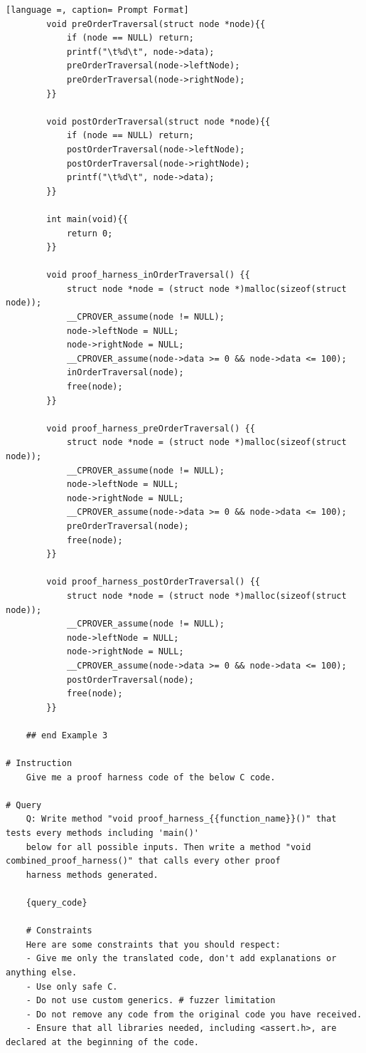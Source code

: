 \documentclass[onecolumn]{NobArticle}
\begin{document}
\begin{lstlisting}[language =, caption= Prompt Format]
		void preOrderTraversal(struct node *node){{
		    if (node == NULL) return;
		    printf("\t%d\t", node->data);
		    preOrderTraversal(node->leftNode);
		    preOrderTraversal(node->rightNode);
		}}
		
		void postOrderTraversal(struct node *node){{
		    if (node == NULL) return;
		    postOrderTraversal(node->leftNode);
		    postOrderTraversal(node->rightNode);
		    printf("\t%d\t", node->data);
		}}
		
		int main(void){{
		    return 0;
		}}
		
		void proof_harness_inOrderTraversal() {{
		    struct node *node = (struct node *)malloc(sizeof(struct node));
		    __CPROVER_assume(node != NULL);
		    node->leftNode = NULL;
		    node->rightNode = NULL;
		    __CPROVER_assume(node->data >= 0 && node->data <= 100);
		    inOrderTraversal(node);
		    free(node);
		}}
		
		void proof_harness_preOrderTraversal() {{
		    struct node *node = (struct node *)malloc(sizeof(struct node));
		    __CPROVER_assume(node != NULL);
		    node->leftNode = NULL;
		    node->rightNode = NULL;
		    __CPROVER_assume(node->data >= 0 && node->data <= 100);
		    preOrderTraversal(node);
		    free(node);
		}}
		
		void proof_harness_postOrderTraversal() {{
		    struct node *node = (struct node *)malloc(sizeof(struct node));
		    __CPROVER_assume(node != NULL);
		    node->leftNode = NULL;
		    node->rightNode = NULL;
		    __CPROVER_assume(node->data >= 0 && node->data <= 100);
		    postOrderTraversal(node);
		    free(node);
		}}
		
	## end Example 3
				
# Instruction
    Give me a proof harness code of the below C code.

# Query
    Q: Write method "void proof_harness_{{function_name}}()" that tests every methods including 'main()' 
    below for all possible inputs. Then write a method "void combined_proof_harness()" that calls every other proof 
    harness methods generated. 
    
    {query_code}

    # Constraints
    Here are some constraints that you should respect:
    - Give me only the translated code, don't add explanations or anything else. 
    - Use only safe C.
    - Do not use custom generics. # fuzzer limitation
    - Do not remove any code from the original code you have received.
    - Ensure that all libraries needed, including <assert.h>, are declared at the beginning of the code.
    
\end{lstlisting}
\end{document}
